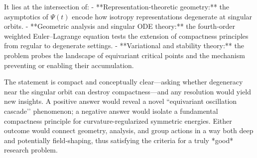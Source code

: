 It lies at the intersection of:
- **Representation‑theoretic geometry:** the asymptotics of \(\Psi(t)\) encode how isotropy representations degenerate at singular orbits.  
- **Geometric analysis and singular ODE theory:** the fourth‑order weighted Euler–Lagrange equation tests the extension of compactness principles from regular to degenerate settings.  
- **Variational and stability theory:** the problem probes the landscape of equivariant critical points and the mechanism preventing or enabling their accumulation.

The statement is compact and conceptually clear—asking whether degeneracy near the singular orbit can destroy compactness—and any resolution would yield new insights.  
A positive answer would reveal a novel “equivariant oscillation cascade’’ phenomenon; a negative answer would isolate a fundamental compactness principle for curvature‑regularized symmetric energies.  Either outcome would connect geometry, analysis, and group actions in a way both deep and potentially field‑shaping, thus satisfying the criteria for a truly *good* research problem.